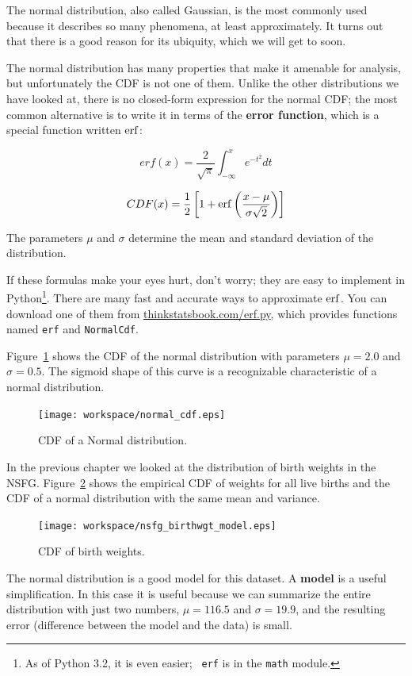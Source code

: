 \documentclass[12pt]{book}
\begin{document}
The normal distribution, also called Gaussian, is the most commonly
used because it describes so many phenomena, at least approximately.
It turns out that there is a good reason for its ubiquity, which we
will get to soon.

The normal distribution has many properties that make it amenable for
analysis, but unfortunately the CDF is not one of them.  Unlike the
other distributions we have looked at, there is no closed-form
expression for the normal CDF; the most common alternative is to write
it in terms of the {\bf error function}, which is a special function
written $\mathrm{erf}$:

\[ erf(x) = \frac{2}{\sqrt{\pi}} \int_{-\infty}^x e^{-t^2} dt \]

\[ CDF(x) = \frac{1}{2} \left[ 1 +
  \mathrm{erf} \left( \frac{x - \mu}{\sigma \sqrt{2}} \right) \right] \]

The parameters $\mu$ and $\sigma$ determine the mean and standard
deviation of the distribution.

If these formulas make your eyes hurt, don't worry; they are easy to
implement in Python\footnote{As of Python 3.2, it is even easier; {\tt
    erf} is in the {\tt math} module.}.  There are many fast and
accurate ways to approximate $\mathrm{erf}$.  You can download one of them
from \url{thinkstatsbook.com/erf.py}, which provides functions named
{\tt erf} and {\tt NormalCdf}.

Figure~\ref{normal_cdf} shows the CDF of the normal distribution
with parameters $\mu=2.0$ and $\sigma=0.5$.  The sigmoid shape of
this curve is a recognizable characteristic of a normal distribution.

\begin{figure}
\centerline{\texttt{[image: workspace/normal\_cdf.eps]}}
\caption{CDF of a Normal distribution.}
\label{normal_cdf}
\end{figure}

In the previous chapter we looked at the distribution of birth
weights in the NSFG.  Figure~\ref{nsfg_birthwgt_model} shows the
empirical CDF of weights for all live births and the CDF of
a normal distribution with the same mean and variance.

\begin{figure}
\centerline{\texttt{[image: workspace/nsfg\_birthwgt\_model.eps]}}
\caption{CDF of birth weights.}
\label{nsfg_birthwgt_model}
\end{figure}

The normal distribution is a good model for this dataset.  A {\bf
  model} is a useful simplification.  In this case it is useful
because we can summarize the entire distribution with just two
numbers, $\mu=116.5$ and $\sigma=19.9$, and the resulting error
(difference between the model and the data) is small.
\end{document}
